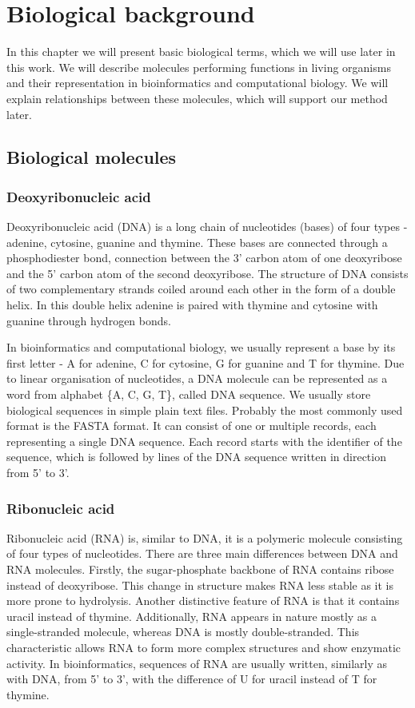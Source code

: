 \chapter{Biological background}
In this chapter we will present basic biological terms, which we will use later in this work.
We will describe molecules performing functions in living organisms and their representation in bioinformatics and computational biology.
We will explain relationships between these molecules, which will support our method later.

\section{Biological molecules}

\subsection{Deoxyribonucleic acid}
Deoxyribonucleic acid (DNA) is a long chain of nucleotides (bases) of four types - adenine, cytosine, guanine and thymine.
These bases are connected through a phosphodiester bond, connection between the 3' carbon atom of one deoxyribose and the 5' carbon atom of the second deoxyribose.
The structure of DNA consists of two complementary strands coiled around each other in the form of a double helix.
In this double helix adenine is paired with thymine and cytosine with guanine through hydrogen bonds.

In bioinformatics and computational biology, we usually represent a base by its first letter - A for adenine, C for cytosine, G for guanine and T for thymine.
Due to linear organisation of nucleotides, a DNA molecule can be represented as a word from alphabet \{A, C, G, T\}, called DNA sequence. We usually store biological sequences in simple plain text files.
Probably the most commonly used format is the FASTA format.
It can consist of one or multiple records, each representing a single DNA sequence.
Each record starts with the identifier of the sequence, which is followed by lines of the DNA sequence written in direction from 5' to 3'.

\subsection{Ribonucleic acid}
Ribonucleic acid (RNA) is, similar to DNA, it is a polymeric molecule consisting of four types of nucleotides.
There are three main differences between DNA and RNA molecules.
Firstly, the sugar-phosphate backbone of RNA contains ribose instead of deoxyribose.
This change in structure makes RNA less stable as it is more prone to hydrolysis.
Another distinctive feature of RNA is that it contains uracil instead of thymine.
Additionally, RNA appears in nature mostly as a single-stranded molecule, whereas DNA is mostly double-stranded.
This characteristic allows RNA to form more complex structures and show enzymatic activity.
In bioinformatics, sequences of RNA are usually written, similarly as with DNA, from 5' to 3', with the difference of U for uracil instead of T for thymine.

